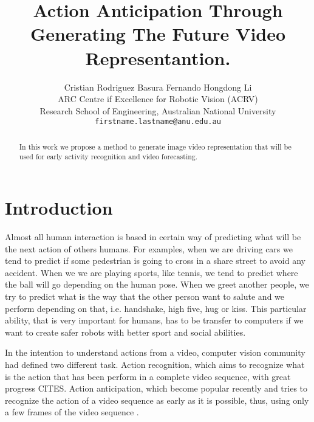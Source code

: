 \documentclass[10pt,twocolumn,letterpaper]{article}
\begin{document}
\title{Action Anticipation Through Generating The Future Video Representantion.}

\author{Cristian Rodriguez \qquad Basura Fernando \qquad Hongdong Li \\
ARC Centre if Excellence for Robotic Vision (ACRV)\\
Research School of Engineering, Australian National University\\
{\tt\small firstname.lastname@anu.edu.au}
}

\maketitle


\begingroup
\let\clearpage\relax
% 
\begin{abstract}
In this work we propose a method to generate image video representation that will be used for early activity recognition and video forecasting.
\end{abstract}

\section{Introduction}
Almost all human interaction is based in certain way of predicting what will be the next action of others humans. For examples, when we are driving cars we tend to predict if some pedestrian is going to cross in a share street to avoid any accident. When we we are playing sports, like tennis, we tend to predict where the ball will go depending on the human pose. When we greet another people, we try to predict what is the way that the other person want to salute and we perform depending on that, i.e. handshake, high five, hug or kiss. This particular ability, that is very important for humans, has to be transfer to computers if we want to create safer robots with better sport and social abilities.

In the intention to understand actions from a video, computer vision community had defined two different task. Action recognition, which aims to recognize what is the action that has been perform in a complete video sequence, with great progress CITES. Action anticipation, which become popular recently and tries to recognize the action of a video sequence as early as it is possible, thus, using only a few frames of the video sequence \cite{aliakbarian2017encouraging, ma2016learning, ryoo2011human, lan2014hierarchical, soomro2016online, soomro2016predicting, yu2012predicting}. 
\end{document}
